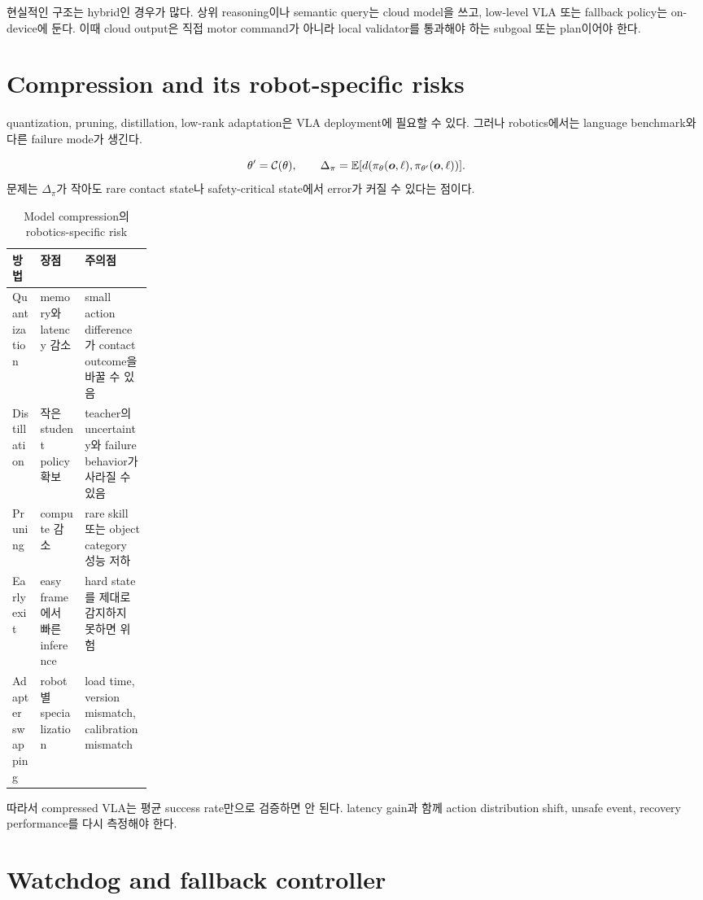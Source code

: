현실적인 구조는 hybrid인 경우가 많다. 상위 reasoning이나 semantic query는 cloud model을 쓰고, low-level VLA 또는 fallback policy는 on-device에 둔다. 이때 cloud output은 직접 motor command가 아니라 local validator를 통과해야 하는 subgoal 또는 plan이어야 한다.

\section{Compression and its robot-specific risks}

quantization, pruning, distillation, low-rank adaptation은 VLA deployment에 필요할 수 있다. 그러나 robotics에서는 language benchmark와 다른 failure mode가 생긴다.

\begin{equation}
  \theta'
  =
  \mathcal{C}(\theta),
  \qquad
  \Delta_{\pi}
  =
  \mathbb{E}
  [
  d(\pi_{\theta}(\bm{o},\ell),\pi_{\theta'}(\bm{o},\ell))
  ].
  \label{eq:ch18-compression-drift}
\end{equation}
문제는 $\Delta_{\pi}$가 작아도 rare contact state나 safety-critical state에서 error가 커질 수 있다는 점이다.

\begin{table}[h]
  \centering
  \caption{Model compression의 robotics-specific risk}
  \begin{tabularx}{\linewidth}{p{0.2\linewidth}X X}
    \toprule
    방법 & 장점 & 주의점 \\
    \midrule
    Quantization & memory와 latency 감소 & small action difference가 contact outcome을 바꿀 수 있음 \\
    Distillation & 작은 student policy 확보 & teacher의 uncertainty와 failure behavior가 사라질 수 있음 \\
    Pruning & compute 감소 & rare skill 또는 object category 성능 저하 \\
    Early exit & easy frame에서 빠른 inference & hard state를 제대로 감지하지 못하면 위험 \\
    Adapter swapping & robot별 specialization & load time, version mismatch, calibration mismatch \\
    \bottomrule
  \end{tabularx}
  \label{tab:ch18-compression-risk}
\end{table}

따라서 compressed VLA는 평균 success rate만으로 검증하면 안 된다. latency gain과 함께 action distribution shift, unsafe event, recovery performance를 다시 측정해야 한다.

\section{Watchdog and fallback controller}


